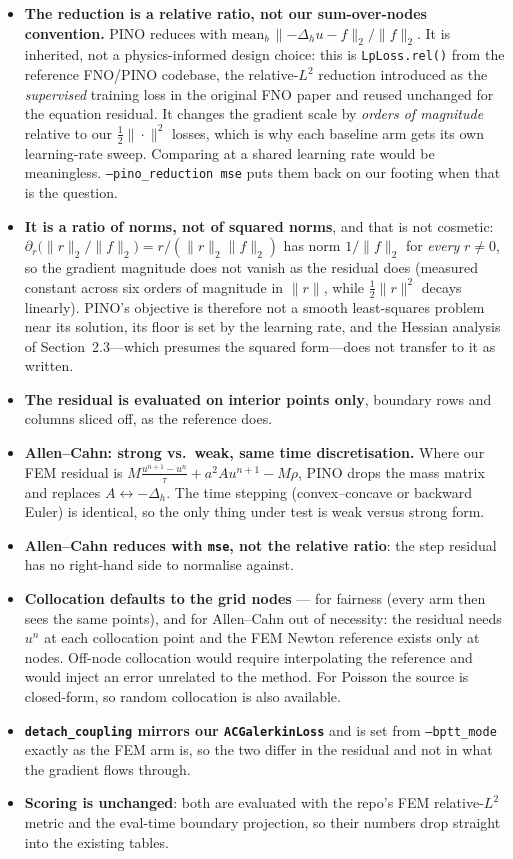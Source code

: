 \documentclass[11pt]{article}
\begin{document}
\begin{itemize}
   \item \textbf{The reduction is a relative ratio, not our sum-over-nodes convention.} PINO reduces
   with $\mathrm{mean}_b\,\|{-\Delta_h u} - f\|_2 / \|f\|_2$. It is inherited, not a physics-informed design choice: this is \texttt{LpLoss.rel()} from the reference FNO/PINO codebase, the relative-$L^2$ reduction introduced as the \emph{supervised} training loss in the original FNO paper and reused unchanged for the equation residual. It changes the gradient scale by
   \emph{orders of magnitude} relative to our $\tfrac12\|\cdot\|^2$ losses, which is why each
   baseline arm gets its own learning-rate sweep. Comparing at a shared learning rate would be
   meaningless. \texttt{--pino\_reduction mse} puts them back on our footing when that is the
   question.
   \item \textbf{It is a ratio of norms, not of squared norms}, and that is not cosmetic:
   $\partial_r \big(\|r\|_2/\|f\|_2\big) = r/(\|r\|_2\|f\|_2)$ has norm $1/\|f\|_2$ for
   \emph{every} $r\neq0$, so the gradient magnitude does not vanish as the residual does (measured
   constant across six orders of magnitude in $\|r\|$, while $\tfrac12\|r\|^2$ decays linearly).
   PINO's objective is therefore not a smooth least-squares problem near its solution, its floor is
   set by the learning rate, and the Hessian analysis of Section~2.3---which presumes the squared
   form---does not transfer to it as written.
   \item \textbf{The residual is evaluated on interior points only}, boundary rows and columns
   sliced off, as the reference does.
   \item \textbf{Allen--Cahn: strong vs.\ weak, same time discretisation.} Where our FEM residual is
   $M\frac{u^{n+1}-u^n}{\tau} + a^2Au^{n+1} - M\rho$, PINO drops the mass matrix and replaces
   $A \leftrightarrow -\Delta_h$. The time stepping (convex--concave or backward Euler) is identical,
   so the only thing under test is weak versus strong form.
   \item \textbf{Allen--Cahn reduces with \texttt{mse}, not the relative ratio}: the step residual
   has no right-hand side to normalise against.
   \item \textbf{Collocation defaults to the grid nodes} --- for fairness (every arm then sees the
   same points), and for Allen--Cahn out of necessity: the residual needs $u^n$ at each collocation
   point and the FEM Newton reference exists only at nodes. Off-node collocation would require
   interpolating the reference and would inject an error unrelated to the method.
   For Poisson the source is closed-form, so random collocation is also available.
   \item \textbf{\texttt{detach\_coupling} mirrors our \texttt{ACGalerkinLoss}} and is set from
   \texttt{--bptt\_mode} exactly as the FEM arm is, so the two differ in the residual and not in
   what the gradient flows through.
   \item \textbf{Scoring is unchanged}: both are evaluated with the repo's FEM relative-$L^2$ metric
   and the eval-time boundary projection, so their numbers drop straight into the existing tables.
\end{itemize}
\end{document}

